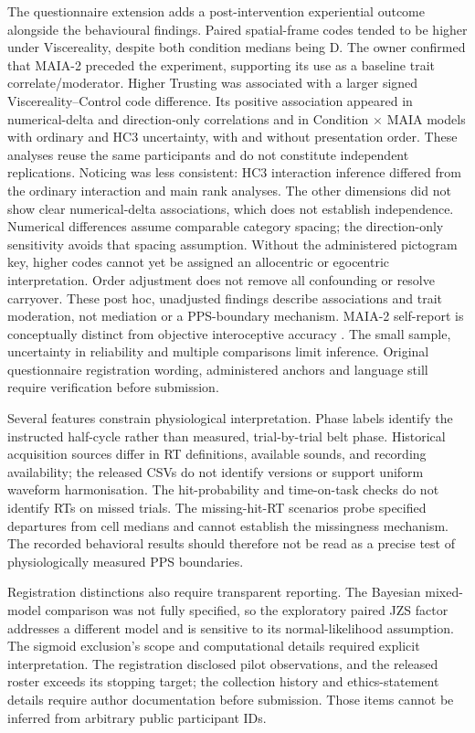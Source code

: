 The questionnaire extension adds a post-intervention experiential outcome alongside the behavioural findings. Paired spatial-frame codes tended to be higher under Viscereality, despite both condition medians being D. The owner confirmed that MAIA-2 preceded the experiment, supporting its use as a baseline trait correlate/moderator. Higher Trusting was associated with a larger signed Viscereality--Control code difference. Its positive association appeared in numerical-delta and direction-only correlations and in Condition $\times$ MAIA models with ordinary and HC3 uncertainty, with and without presentation order. These analyses reuse the same participants and do not constitute independent replications. Noticing was less consistent: HC3 interaction inference differed from the ordinary interaction and main rank analyses. The other dimensions did not show clear numerical-delta associations, which does not establish independence. Numerical differences assume comparable category spacing; the direction-only sensitivity avoids that spacing assumption. Without the administered pictogram key, higher codes cannot yet be assigned an allocentric or egocentric interpretation. Order adjustment does not remove all confounding or resolve carryover. These post hoc, unadjusted findings describe associations and trait moderation, not mediation or a PPS-boundary mechanism. MAIA-2 self-report is conceptually distinct from objective interoceptive accuracy \citep{Mehling2018,Garfinkel2015}. The small sample, uncertainty in reliability and multiple comparisons limit inference. Original questionnaire registration wording, administered anchors and language still require verification before submission.

Several features constrain physiological interpretation. Phase labels identify the instructed half-cycle rather than measured, trial-by-trial belt phase. Historical acquisition sources differ in RT definitions, available sounds, and recording availability; the released CSVs do not identify versions or support uniform waveform harmonisation. The hit-probability and time-on-task checks do not identify RTs on missed trials. The missing-hit-RT scenarios probe specified departures from cell medians and cannot establish the missingness mechanism. The recorded behavioral results should therefore not be read as a precise test of physiologically measured PPS boundaries.

Registration distinctions also require transparent reporting. The Bayesian mixed-model comparison was not fully specified, so the exploratory paired JZS factor addresses a different model and is sensitive to its normal-likelihood assumption. The sigmoid exclusion's scope and computational details required explicit interpretation. The registration disclosed pilot observations, and the released roster exceeds its stopping target; the collection history and ethics-statement details require author documentation before submission. Those items cannot be inferred from arbitrary public participant IDs.

